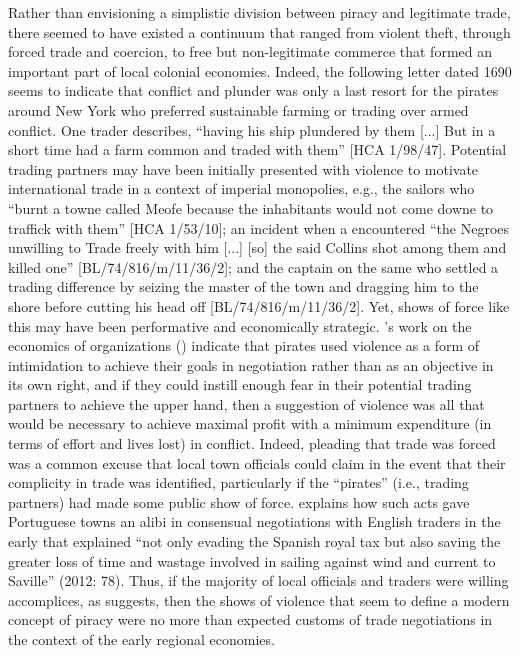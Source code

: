 \largerpage
Rather than envisioning a simplistic division between piracy and legitimate trade, there seemed to have existed a continuum that ranged from violent theft, through forced trade and coercion, to free but non-legitimate commerce that formed an important part of local colonial economies. Indeed, the following letter dated 1690 seems to indicate that conflict and plunder was only a last resort for the pirates around New York who preferred sustainable farming or trading over armed conflict. One trader describes, “having his ship plundered by them [...] But in a short time had a farm common and traded with them” [HCA 1/98/47]. Potential trading partners may have been initially presented with violence to motivate international trade in a context of imperial monopolies, e.g., the sailors who “burnt a towne called Meofe because the inhabitants would not come downe to traffick with them” [HCA 1/53/10]; an incident when a  encountered “the Negroes unwilling to Trade freely with him [...] [so] the said Collins shot among them and killed one” [BL/74/816/m/11/36/2]; and the captain on the same  who settled a trading difference by seizing the master of the town and dragging him to the shore before cutting his head off [BL/74/816/m/11/36/2]. Yet, shows of force like this may have been performative and economically strategic. \citeauthor{Leeson2007}’s work on the economics of  organizations (\citeyear{Leeson2007,Leeson2008}) indicate that pirates used violence as a form of intimidation to achieve their goals in negotiation rather than as an objective in its own right, and if they could instill enough fear in their potential trading partners to achieve the upper hand, then a suggestion of violence was all that would be necessary to achieve maximal profit with a minimum expenditure (in terms of effort and lives lost) in conflict. Indeed, pleading that trade was forced was a common excuse that local town officials could claim in the event that their complicity in  trade was identified, particularly if the “pirates” (i.e., trading partners) had made some public show of force. \citeauthor{Bicheno2012} explains how such acts gave Portuguese towns an alibi in consensual negotiations with English traders in the early  that explained “not only evading the Spanish royal tax but also saving the greater loss of time and wastage involved in sailing against wind and current to Saville” (2012: 78). Thus, if the majority of local officials and traders were willing accomplices, as \citeauthor{Bicheno2012} suggests, then the shows of violence that seem to define a modern concept of piracy were no more than expected customs of trade negotiations in the context of the early regional economies. 

